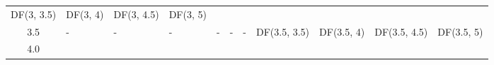 \documentclass{article}
\begin{document}
\begin{longtable}[c]{@{}cllllllllll@{}}
\begin{minipage}[t]{0.15\columnwidth}
DF(3, 3.5)
\strut\end{minipage} &
\begin{minipage}[t]{0.13\columnwidth}\raggedright\strut
DF(3, 4)
\strut\end{minipage} &
\begin{minipage}[t]{0.15\columnwidth}\raggedright\strut
DF(3, 4.5)
\strut\end{minipage} &
\begin{minipage}[t]{0.13\columnwidth}\raggedright\strut
DF(3, 5)
\strut\end{minipage}\tabularnewline
\begin{minipage}[t]{0.08\columnwidth}\centering\strut
3.5
\strut\end{minipage} &
\begin{minipage}[t]{0.15\columnwidth}\raggedright\strut
-
\strut\end{minipage} &
\begin{minipage}[t]{0.13\columnwidth}\raggedright\strut
-
\strut\end{minipage} &
\begin{minipage}[t]{0.15\columnwidth}\raggedright\strut
-
\strut\end{minipage} &
\begin{minipage}[t]{0.13\columnwidth}\raggedright\strut
-
\strut\end{minipage} &
\begin{minipage}[t]{0.15\columnwidth}\raggedright\strut
-
\strut\end{minipage} &
\begin{minipage}[t]{0.13\columnwidth}\raggedright\strut
-
\strut\end{minipage} &
\begin{minipage}[t]{0.15\columnwidth}\raggedright\strut
DF(3.5, 3.5)
\strut\end{minipage} &
\begin{minipage}[t]{0.13\columnwidth}\raggedright\strut
DF(3.5, 4)
\strut\end{minipage} &
\begin{minipage}[t]{0.15\columnwidth}\raggedright\strut
DF(3.5, 4.5)
\strut\end{minipage} &
\begin{minipage}[t]{0.13\columnwidth}\raggedright\strut
DF(3.5, 5)
\strut\end{minipage}\tabularnewline
\begin{minipage}[t]{0.08\columnwidth}\centering\strut
4.0
\strut\end{minipage} &
\begin{minipage}[t]{0.15\columnwidth}\raggedright\strut

\end{minipage}
\end{longtable}
\end{document}
